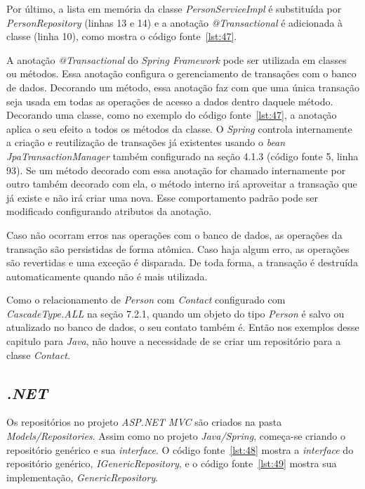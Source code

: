 
Por último, a lista em memória da classe \textit{PersonServiceImpl} é substituída por \textit{PersonRepository} (linhas 13 e 14) e a anotação \textit{@Transactional} é adicionada à classe (linha 10), como mostra o código fonte~\ref{lst:47}.


A anotação \textit{@Transactional} do \textit{Spring Framework} pode ser utilizada em classes ou métodos. Essa anotação configura o gerenciamento de transações com o banco de dados. Decorando um método, essa anotação faz com que uma única transação seja usada em todas as operações de acesso a dados dentro daquele método. Decorando uma classe, como no exemplo do código fonte~\ref{lst:47}, a anotação aplica o seu efeito a todos os métodos da classe.  O \textit{Spring} controla internamente a criação e reutilização de transações já existentes usando o \textit{bean} \textit{JpaTransactionManager} também configurado na seção 4.1.3 (código fonte 5, linha 93). Se um método decorado com essa anotação for chamado internamente por outro também decorado com ela, o método interno irá aproveitar a transação que já existe e não irá criar uma nova. Esse comportamento padrão pode ser modificado configurando atributos da anotação. 

Caso não ocorram erros nas operações com o banco de dados, as operações da transação são persistidas de forma atômica. Caso haja algum erro, as operações são revertidas e uma exceção é disparada. De toda forma, a transação é destruída automaticamente quando não é mais utilizada.

Como o relacionamento de \textit{Person} com \textit{Contact} configurado com \textit{CascadeType.ALL} na seção 7.2.1, quando um objeto do tipo \textit{Person} é salvo ou atualizado no banco de dados, o seu contato também é. Então nos exemplos desse capitulo para \textit{Java}, não houve a necessidade de se criar um repositório para a classe \textit{Contact}.

\subsection{\textit{.NET}}

Os repositórios no projeto \textit{ASP.NET MVC} são criados na pasta \textit{Models/Repositories}. Assim como no projeto \textit{Java/Spring}, começa-se criando o repositório genérico e sua \textit{interface}. O código fonte~\ref{lst:48} mostra a \textit{interface} do repositório genérico, \textit{IGenericRepository}, e o código fonte~\ref{lst:49} mostra sua implementação, \textit{GenericRepository}.

